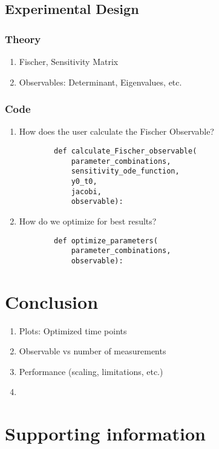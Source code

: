 \documentclass[10pt,A4paper]{article}
\begin{document}
\subsection*{Experimental Design}
\subsubsection*{Theory}
\begin{enumerate}
    \item Fischer, Sensitivity Matrix
    \item Observables: Determinant, Eigenvalues, etc.
\end{enumerate}
%
\subsubsection*{Code}
\begin{enumerate}
    \item How does the user calculate the Fischer Observable?
    \begin{verbatim}
        def calculate_Fischer_observable(
            parameter_combinations,
            sensitivity_ode_function,
            y0_t0,
            jacobi,
            observable):
    \end{verbatim}
    \item How do we optimize for best results?
    \begin{verbatim}
        def optimize_parameters(
            parameter_combinations,
            observable):
    \end{verbatim}
\end{enumerate}
%
%
%
\section*{Conclusion}
\begin{enumerate}
    \item Plots: Optimized time points
    \item Observable vs number of measurements
    \item Performance (scaling, limitations, etc.)
    \item 
\end{enumerate}
%
%
%
\section*{Supporting information}
%
%
%
\nolinenumbers

\end{document}
